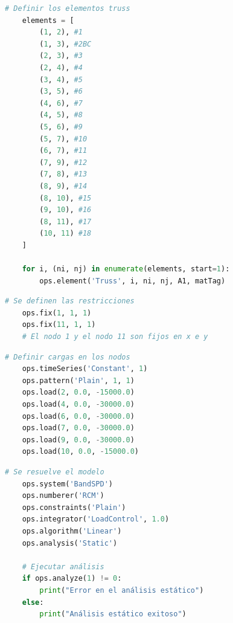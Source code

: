 \begin{lstlisting}[language=Python]
    # Definir los elementos truss
    elements = [
        (1, 2), #1
        (1, 3), #2BC
        (2, 3), #3
        (2, 4), #4
        (3, 4), #5
        (3, 5), #6
        (4, 6), #7
        (4, 5), #8
        (5, 6), #9
        (5, 7), #10
        (6, 7), #11
        (7, 9), #12
        (7, 8), #13
        (8, 9), #14
        (8, 10), #15
        (9, 10), #16
        (8, 11), #17
        (10, 11) #18
    ]

    for i, (ni, nj) in enumerate(elements, start=1):
        ops.element('Truss', i, ni, nj, A1, matTag)
\end{lstlisting}

\begin{lstlisting}[language=Python]
    # Se definen las restricciones
    ops.fix(1, 1, 1)  
    ops.fix(11, 1, 1)  
    # El nodo 1 y el nodo 11 son fijos en x e y
\end{lstlisting}

\begin{lstlisting}[language=Python]
    # Definir cargas en los nodos
    ops.timeSeries('Constant', 1)
    ops.pattern('Plain', 1, 1)
    ops.load(2, 0.0, -15000.0)
    ops.load(4, 0.0, -30000.0)
    ops.load(6, 0.0, -30000.0)
    ops.load(7, 0.0, -30000.0)
    ops.load(9, 0.0, -30000.0)
    ops.load(10, 0.0, -15000.0)
\end{lstlisting}

\begin{lstlisting}[language=Python]
    # Se resuelve el modelo
    ops.system('BandSPD')
    ops.numberer('RCM')
    ops.constraints('Plain')
    ops.integrator('LoadControl', 1.0)
    ops.algorithm('Linear')
    ops.analysis('Static')

    # Ejecutar análisis
    if ops.analyze(1) != 0:
        print("Error en el análisis estático")
    else:
        print("Análisis estático exitoso")
\end{lstlisting}
